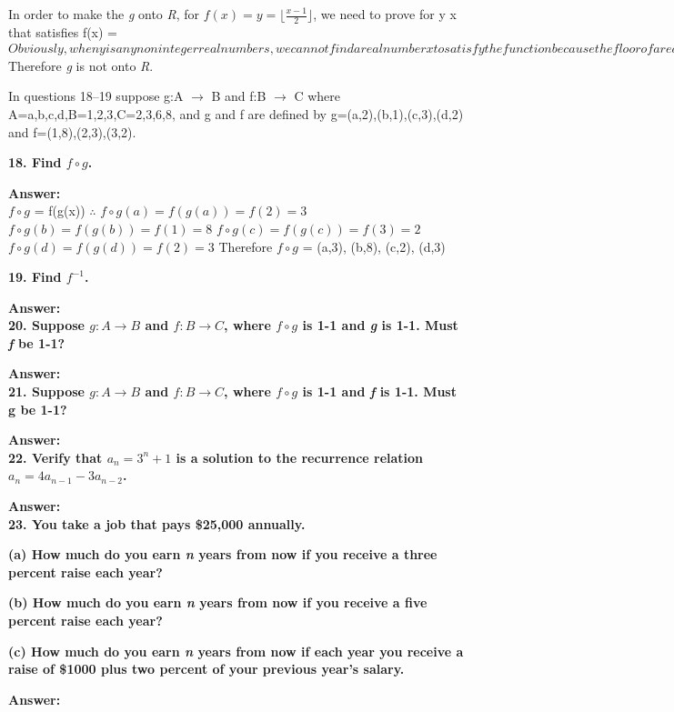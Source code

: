 \documentclass{article}
\begin{document}
\begin{large}
In order to make the \emph{g} onto \emph{R}, 
for $f(x) = y = \lfloor \frac{x-1}{2}\rfloor$, we need to prove for \forall y \exists x that satisfies f(x) = \lfloor {}\rfloor$
Obviously, when y is any non integer real numbers, we cannot find a real number x to satisfy the function because the floor of a real number is always an integer.
Thus it is false that \forall y \exists x that satisfies f(x) = \lfloor \frac{x-1}{2}\rfloor$
Therefore \emph{g} is not onto \emph{R}.


In questions 18–19 suppose g:A $\to$ B and f:B $\to$ C where A={a,b,c,d},B={1,2,3},C={2,3,6,8}, and g and f are defined by g={(a,2),(b,1),(c,3),(d,2)} and f={(1,8),(2,3),(3,2)}.

\textbf{18. Find $f\circ g$.}

\textbf{Answer:} \\

$f \circ g$ = f(g(x))
$\therefore$ $f \circ g(a) = f(g(a)) = f(2) = 3$
             $f \circ g(b) = f(g(b)) = f(1) = 8$
             $f \circ g(c) = f(g(c)) = f(3) = 2$
             $f \circ g(d) = f(g(d)) = f(2) = 3$
Therefore $f \circ g$ = {(a,3), (b,8), (c,2), (d,3)}


\textbf{19. Find $f^{-1}$.}

\textbf{Answer:} \\




\textbf{20. Suppose $g:A\to B$ and $f:B\to C$, where $f\circ g$ is 1-1 and \emph{g} is 1-1. Must \emph{f} be 1-1?}

\textbf{Answer:} \\





\textbf{21. Suppose $g:A\to B$ and $f:B\to C$, where $f\circ g$ is 1-1 and \emph{f} is 1-1. Must g be 1-1?}

\textbf{Answer:} \\




\textbf{22. Verify that $a_{n}={3^{n}+1}$ is a solution to the recurrence relation $a_{n}=4a_{n-1}-3a_{n-2}$.}

\textbf{Answer:} \\





\textbf{23. You take a job that pays \$25,000 annually.}

\textbf{(a) How much do you earn \emph{n} years from now if you receive a three percent raise each year?}

\textbf{(b) How much do you earn \emph{n} years from now if you receive a five percent raise each year? }

\textbf{(c) How much do you earn \emph{n} years from now if each year you receive a raise of \$1000 plus two percent of your previous year's salary.}

\textbf{Answer:} \\








\end{large}
\end{document}
